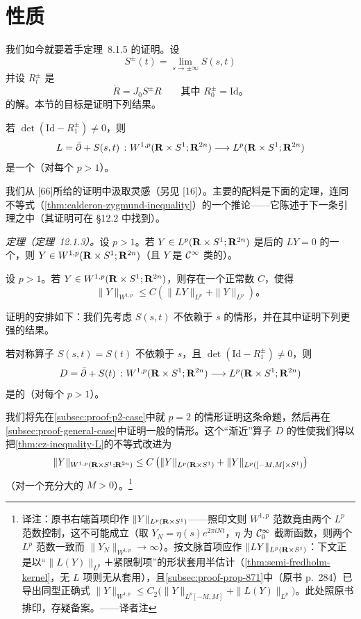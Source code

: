 
\section{\trFredholm{}性质}
\label{sec:fredholm-property}

我们如今就要着手定理~8.1.5 的证明。设
\[
S^{\pm}(t)=\lim_{s\to\pm\infty}S(s,t)
\]
并设 $R^{\pm}_t$ 是
\[
\dot{R}=J_0S^{\pm}R\qquad\text{其中 }R^{\pm}_0=\mathrm{Id}\text{。}
\]
的解。本节的目标是证明下列结果。

\begin{proposition}\label{thm:fredholm-operator-L}
若 $\det(\mathrm{Id}-R^{\pm}_1)\ne 0$，则
\[
L=\bar{\partial}+S(s,t)\ \colon W^{1,p}(\mathbf{R}\times S^{1};\mathbf{R}^{2n})\longrightarrow L^{p}(\mathbf{R}\times S^{1};\mathbf{R}^{2n})
\]
是一个\trFredholmOperator（对每个 $p>1$）。
\end{proposition}

我们从 [66]所给的证明中汲取灵感（另见 [16]）。主要的配料是下面的\trEllipticRegularity{}定理，连同\trCalderonZygmund{}不等式（\cref{thm:calderon-zygmund-inequality}）的一个推论——它陈述于下一条引理之中（其证明可在 §12.2 中找到）。

\emph{定理（定理~12.1.3）。}设 $p>1$。若 $Y\in L^{p}(\mathbf{R}\times S^{1};\mathbf{R}^{2n})$ 是\trLinearization{}后的\trFloerEquation{} $LY=0$ 的一个\trWeakSolution，则 $Y\in W^{1,p}(\mathbf{R}\times S^{1};\mathbf{R}^{2n})$（且 $Y$ 是 $\mathcal{C}^\infty$ 类的）。

\begin{lemma}\label{thm:cz-inequality-L}
设 $p>1$。若 $Y\in W^{1,p}(\mathbf{R}\times S^{1};\mathbf{R}^{2n})$，则存在一个正常数 $C$，使得
\[
\|Y\|_{W^{1,p}}\le C\left(\|LY\|_{L^{p}}+\|Y\|_{L^{p}}\right)\text{。}
\]
\end{lemma}

证明的安排如下：我们先考虑 $S(s,t)$ 不依赖于 $s$ 的情形，并在其中证明下列更强的结果。

\begin{proposition}\label{thm:d-bijective-independent-s}
若对称算子 $S(s,t)=S(t)$ 不依赖于 $s$，且 $\det(\mathrm{Id}-R^{\pm}_1)\ne 0$，则
\[
D=\bar{\partial}+S(t)\ \colon W^{1,p}(\mathbf{R}\times S^{1};\mathbf{R}^{2n})\longrightarrow L^{p}(\mathbf{R}\times S^{1};\mathbf{R}^{2n})
\]
是\trBijective{}的（对每个 $p>1$）。
\end{proposition}

我们将先在\cref{subsec:proof-p2-case}中就 $p=2$ 的情形证明这条命题，然后再在\cref{subsec:proof-general-case}中证明一般的情形。这个“渐近”算子 $D$ 的\trInvertible{}性使我们得以把\cref{thm:cz-inequality-L}的不等式改进为
\[
\|Y\|_{W^{1,p}(\mathbf{R}\times S^{1};\mathbf{R}^{2n})}\le C\left(\|Y\|_{L^{p}(\mathbf{R}\times S^{1})}+\|Y\|_{L^{p}([-M,M]\times S^{1})}\right)
\]
（对一个充分大的 $M>0$）。\footnote{译注：原书右端首项印作 $\|Y\|_{L^{p}(\mathbf{R}\times S^{1})}$——照印文则 $W^{1,p}$ 范数竟由两个 $L^{p}$ 范数控制，这不可能成立（取 $Y_N=\eta(s)e^{2\pi iNt}$，$\eta$ 为 $\mathcal{C}^\infty_0$ 截断函数，则两个 $L^{p}$ 范数一致\trBounded{}而 $\|Y_N\|_{W^{1,p}}\to\infty$）。按文脉首项应作 $\|LY\|_{L^{p}(\mathbf{R}\times S^{1})}$：下文正是以“$\|L(Y)\|_{L^{p}}$＋紧限制项”的形状套用半\trFredholm{}估计（\cref{thm:semi-fredholm-kernel}，无 $L$ 项则无从套用），且\cref{subsec:proof-prop-871}中（原书 p.~284）已导出同型正确式 $\|Y\|_{W^{1,p}}\le C_2\bigl(\|Y\|_{L^{p}[-M,M]}+\|L(Y)\|_{L^{p}}\bigr)$。此处照原书排印，存疑备案。——译者注}

